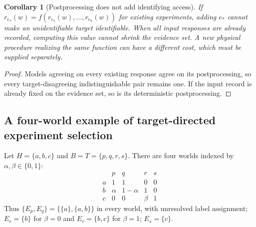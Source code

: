 \documentclass[11pt]{article}
\newtheorem{corollary}[theorem]{Corollary}
\theoremstyle{definition}
\begin{document}
\begin{corollary}[Postprocessing does not add identifying access]
\label{cor:processing}
If $r_{e_*}(w)=f(r_{e_1}(w),\ldots,r_{e_k}(w))$ for existing experiments,
adding $e_*$ cannot make an unidentifiable target identifiable. When all
input responses are already recorded, computing this value cannot shrink
the evidence set. A new physical procedure realizing the same function
can have a different cost, which must be supplied separately.
\end{corollary}
\begin{proof}
Models agreeing on every existing response agree on its postprocessing,
so every target-disagreeing indistinguishable pair remains one. If the
input record is already fixed on the evidence set, so is its deterministic
postprocessing.
\end{proof}

\subsection{A four-world example of target-directed experiment selection}
Let $H=\{a,b,c\}$ and $B=T=\{p,q,r,s\}$. There are four worlds indexed by $\alpha,\beta\in\{0,1\}$:
\[
\begin{array}{c|cccc}
 &p&q&r&s\\\hline
 a&1&1&0&0\\
 b&\alpha&1-\alpha&1&0\\
 c&0&0&\beta&1
\end{array} \tag{E6}
\]
Thus $\{E_p,E_q\}=\{\{a\},\{a,b\}\}$ in every world, with unresolved label assignment; $E_r=\{b\}$ for $\beta=0$ and $E_r=\{b,c\}$ for $\beta=1$; $E_s=\{c\}$.
\end{document}

